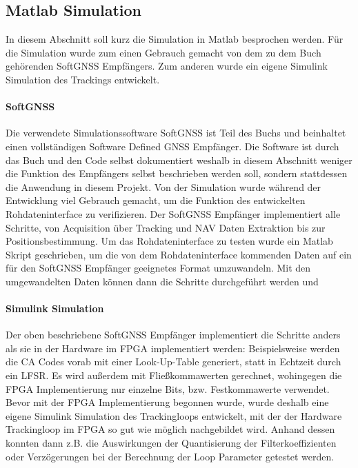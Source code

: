 \subsection{Matlab Simulation}
In diesem Abschnitt soll kurz die Simulation in Matlab besprochen werden. Für die Simulation wurde zum einen Gebrauch gemacht von dem zu dem Buch \cite{borre2007software} gehörenden SoftGNSS Empfängers. Zum anderen wurde ein eigene Simulink Simulation des Trackings entwickelt. 

\paragraph{SoftGNSS} Die verwendete Simulationssoftware SoftGNSS ist Teil des Buchs \cite{borre2007software} und beinhaltet einen vollständigen Software Defined GNSS Empfänger. Die Software ist durch das Buch und den Code selbst dokumentiert weshalb in diesem Abschnitt weniger die Funktion des Empfängers selbst beschrieben werden soll, sondern stattdessen die Anwendung in diesem Projekt. Von der Simulation wurde während der Entwicklung viel Gebrauch gemacht, um die Funktion des entwickelten Rohdateninterface zu verifizieren. Der SoftGNSS Empfänger implementiert alle Schritte, von Acquisition über Tracking und NAV Daten Extraktion bis zur Positionsbestimmung. Um das Rohdateninterface zu testen wurde ein Matlab Skript geschrieben, um die von dem Rohdateninterface kommenden Daten auf ein für den SoftGNSS Empfänger geeignetes Format umzuwandeln. Mit den umgewandelten Daten können dann die Schritte durchgeführt werden und 

\paragraph{Simulink Simulation}
Der oben beschriebene SoftGNSS Empfänger implementiert die Schritte anders als sie in der Hardware im FPGA implementiert werden: Beispielsweise werden die \gls{CA} Codes vorab mit einer Look-Up-Table generiert, statt in Echtzeit durch ein LFSR. Es wird außerdem mit Fließkommawerten gerechnet, wohingegen die FPGA Implementierung nur einzelne Bits, bzw. Festkommawerte verwendet. Bevor mit der FPGA Implementierung begonnen wurde, wurde deshalb eine eigene Simulink Simulation des Trackingloops entwickelt, mit der der Hardware Trackingloop im FPGA so gut wie möglich nachgebildet wird. Anhand dessen konnten dann z.B. die Auswirkungen  der Quantisierung der Filterkoeffizienten oder Verzögerungen bei der Berechnung der Loop Parameter getestet werden. 




